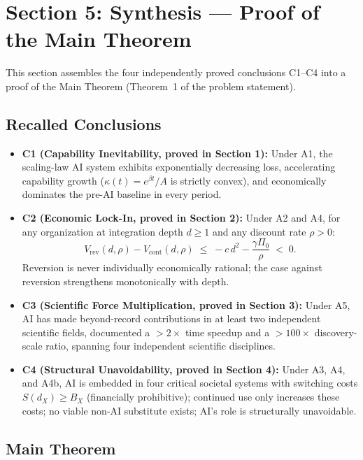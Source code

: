 \documentclass[12pt]{article}
\begin{document}
\section*{Section 5: Synthesis --- Proof of the Main Theorem}

This section assembles the four independently proved conclusions
C1--C4 into a proof of the Main Theorem (Theorem~1 of the problem statement).

\subsection*{Recalled Conclusions}

\begin{itemize}
  \item \textbf{C1 (Capability Inevitability, proved in Section 1):}
    Under A1, the scaling-law AI system exhibits exponentially decreasing
    loss, accelerating capability growth ($\kappa(t) = e^{\beta t}/A$
    is strictly convex), and economically dominates the pre-AI baseline
    in every period.

  \item \textbf{C2 (Economic Lock-In, proved in Section 2):}
    Under A2 and A4, for any organization at integration depth $d \geq 1$
    and any discount rate $\rho > 0$:
    \[
      V_{\mathrm{rev}}(d,\rho) - V_{\mathrm{cont}}(d,\rho)
      \;\leq\; -c\,d^2 - \frac{\gamma\Pi_0}{\rho} \;<\; 0.
    \]
    Reversion is never individually economically rational; the case
    against reversion strengthens monotonically with depth.

  \item \textbf{C3 (Scientific Force Multiplication, proved in Section 3):}
    Under A5, AI has made beyond-record contributions in at least two
    independent scientific fields, documented a $>2\times$ time speedup
    and a $>100\times$ discovery-scale ratio, spanning four independent
    scientific disciplines.

  \item \textbf{C4 (Structural Unavoidability, proved in Section 4):}
    Under A3, A4, and A4b, AI is embedded in four critical societal
    systems with switching costs $S(d_X) \geq B_X$ (financially
    prohibitive); continued use only increases these costs; no viable
    non-AI substitute exists; AI's role is structurally unavoidable.
\end{itemize}

\subsection*{Main Theorem}
\end{document}
